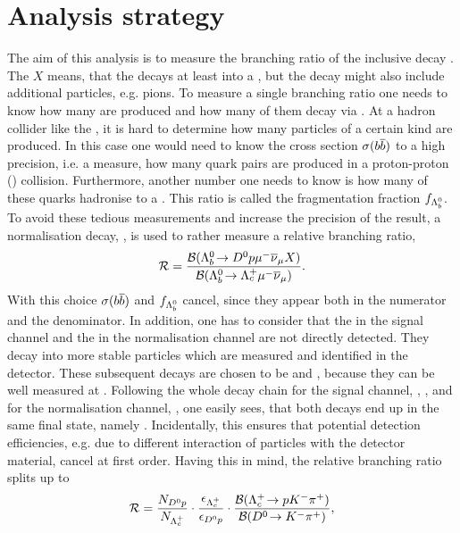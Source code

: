 \chapter{Analysis strategy}
\label{sec:Strategy}
The aim of this analysis is to measure the branching ratio of the inclusive decay \LbToDpmunuX.
The $X$ means, that the \Lb decays at least into a \Dz\proton\mun\neumb, but the decay might also include additional particles, e.g. pions.
To measure a single branching ratio one needs to know how many \Lb are produced and how many of them decay via \LbToDpmunu.
At a hadron collider like the \lhc, it is hard to determine how many particles of a certain kind are produced.
In this case one would need to know the \bquark\bquarkbar cross section $\sigma({b}{\overline {{b}}})$ to a high precision, i.e. a measure, how many \bquark\bquarkbar quark pairs are produced in a proton-proton (\proton\proton) collision.
Furthermore, another number one needs to know is how many of these \bquark quarks hadronise to a \Lb.
This ratio is called the fragmentation fraction $f_{{{\Lambda}^0_{b}}}$.
To avoid these tedious measurements and increase the precision of the result, a normalisation decay, \LbToLcmunu, is used to rather measure a relative branching ratio,
\begin{align}
	\mathcal{R} =
	\frac{{\cal B}({{\Lambda}^0_{b}}\!\rightarrow {\ensuremath{{D}^0}}{\ensuremath{p}} {\ensuremath{\mu^-}} {\ensuremath{{\overline{\nu}}_\mu}} X)}{{\cal B}({{\Lambda}^0_{b}}\!\rightarrow {\ensuremath{{\Lambda}^+_{c}}} {\ensuremath{\mu^-}}{\ensuremath{{\overline{\nu}}_\mu}})}. \label{eq:R_def}
\end{align}
With this choice $\sigma({b}{\overline {{b}}})$ and $f_{{{\Lambda}^0_{b}}}$ cancel, since they appear both in the numerator and the denominator.
In addition, one has to consider that the \Dz in the signal channel and the \Lc in the normalisation channel are not directly detected.
They decay into more stable particles which are measured and identified in the detector.
These subsequent decays are chosen to be \DToKpi and \LcTopKpi, because they can be well measured at \lhcb.
Following the whole decay chain for the signal channel, \LbToDpmunuX, \DToKpi, and for the normalisation channel, \LbToLcmunu, \LcTopKpi one easily sees, that both decays end up in the same final state, namely \pKpi\mun\neumb.
Incidentally, this ensures that potential detection efficiencies, e.g. due to different interaction of particles with the detector material, cancel at first order.
Having this in mind, the relative branching ratio splits up to
\begin{align}
	\mathcal{R} =
	 \frac{N_{{{D}^0}{p}}}{N_{{{\Lambda}^+_{c}}}}  
	 \cdot \frac{\epsilon_{{{\Lambda}^+_{c}}}}{\epsilon_{{{D}^0}{p}}}
	 \cdot \frac{{\cal B}({{\Lambda}^+_{c}}\!\rightarrow p {{K}^-} {{\pi}^+})}{{\cal B}({{D}^0}\!\rightarrow {\ensuremath{{K}^-}}{\ensuremath{{\pi}^+}})}, \label{eq:R}
\end{align}
